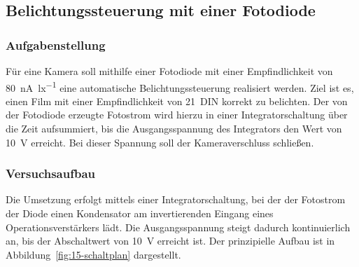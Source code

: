 \subsection{Belichtungssteuerung mit einer Fotodiode}\label{sec:1-5}

\subsubsection{Aufgabenstellung}

Für eine Kamera soll mithilfe einer Fotodiode mit einer Empfindlichkeit von \SI{80}{\nano\ampere\per\lux} eine automatische Belichtungssteuerung realisiert werden. Ziel ist es, einen Film mit einer Empfindlichkeit von \SI{21}{DIN} korrekt zu belichten. Der von der Fotodiode erzeugte Fotostrom wird hierzu in einer Integratorschaltung über die Zeit aufsummiert, bis die Ausgangsspannung des Integrators den Wert von \SI{10}{\volt} erreicht. Bei dieser Spannung soll der Kameraverschluss schließen.

\subsubsection{Versuchsaufbau}

Die Umsetzung erfolgt mittels einer Integratorschaltung, bei der der Fotostrom der Diode einen Kondensator am invertierenden Eingang eines Operationsverstärkers lädt. Die Ausgangsspannung steigt dadurch kontinuierlich an, bis der Abschaltwert von \SI{10}{\volt} erreicht ist. Der prinzipielle Aufbau ist in Abbildung~\ref{fig:15-schaltplan} dargestellt.

